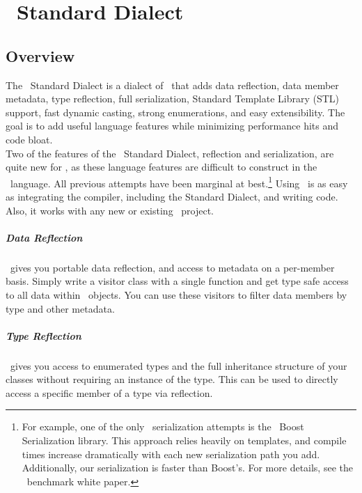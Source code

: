 
\chapter{\opCPP\ Standard Dialect}
\label{chap:opcpp_standard_dialect}

\section{Overview}
\label{sec:opcpp_overview}

The \opCPP\ Standard Dialect is a dialect of \cpp\ that adds data reflection, data member metadata, type reflection, full serialization, Standard Template Library (STL) support, fast dynamic casting, strong enumerations, and easy extensibility.  The goal is to add useful language features while minimizing performance hits and code bloat. \\

Two of the features of the \opCPP\ Standard Dialect, reflection and serialization, are quite new for \cpp, as these language features are difficult to construct in the \cpp\ language.  All previous attempts have been marginal at best.\footnote{For example, one of the only \cpp\ serialization attempts is the \cpp\ Boost Serialization library.  This approach relies heavily on templates, and compile times increase dramatically with each new serialization path you add.  Additionally, our serialization is faster than Boost's.  For more details, see the \opCPP\ benchmark white paper.}  Using \opCPP\ is as easy as integrating the compiler, including the Standard Dialect, and writing code.  Also, it works with any new or existing \cpp\ project.

\paragraph{Data Reflection}
\opCPP\ gives you portable data reflection, and access to metadata on a per-member basis.  Simply write a visitor
class with a single function and get type safe access to all data within \opCPP\ objects.  You can use these visitors to filter data members by type and other metadata.

\paragraph{Type Reflection}
\opCPP\ gives you access to enumerated types and the full inheritance structure of your classes without requiring an instance of the type.  This can be used to directly access a specific member of a type via reflection.

